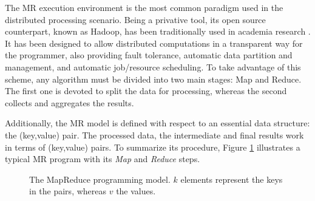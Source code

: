 \documentclass[3p,review]{elsarticle}
\begin{document}
	
	The MR execution environment \cite{Dea08} is the most common paradigm used in the distributed processing scenario. Being a privative tool, its open source counterpart, known as Hadoop, has been traditionally used in academia research \cite{Whi15-Hadoop}. It has been designed to allow distributed computations in a transparent way for the programmer, also providing fault tolerance, automatic data partition and management, and automatic job/resource scheduling. To take advantage of this scheme, any algorithm must be divided into two main stages: Map and Reduce. The first one is devoted to split the data for processing, whereas the second collects and aggregates the results.
	
	Additionally, the MR model is defined with respect to an essential data structure: the (key,value) pair. The processed data, the intermediate and final results work in terms of (key,value) pairs. To summarize its procedure, Figure \ref{fig:mapreduce} illustrates a typical MR program with its \textit{Map} and \textit{Reduce} steps. %
	
	\begin{figure}[!ht]
		\centering {} \caption{The MapReduce programming model. $k$ elements represent the keys in the pairs, whereas $v$ the values.}
		\label{fig:mapreduce}
	\end{figure}
	
\end{document}
